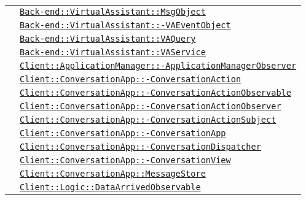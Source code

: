 \begin{longtable}{|>{\centering}m{3cm}|m{10cm}<{\centering}|}
& \hyperref[Back-end::VirtualAssistant::MsgObject]{\texttt{Back-end::VirtualAssistant::MsgObject}}\\
& \hyperref[Back-end::VirtualAssistant::VAEventObject]{\texttt{Back-end::VirtualAssistant::-\linebreak VAEventObject}}\\
& \hyperref[Back-end::VirtualAssistant::VAQuery]{\texttt{Back-end::VirtualAssistant::VAQuery}}\\
& \hyperref[Back-end::VirtualAssistant::VAService]{\texttt{Back-end::VirtualAssistant::VAService}}\\
& \hyperref[Client::ApplicationManager::ApplicationManagerObserver]{\texttt{Client::ApplicationManager::-\linebreak ApplicationManagerObserver}}\\
& \hyperref[Client::ConversationApp::ConversationAction]{\texttt{Client::ConversationApp::-\linebreak ConversationAction}}\\
& \hyperref[Client::ConversationApp::ConversationActionObservable]{\texttt{Client::ConversationApp::-\linebreak ConversationActionObservable}}\\
& \hyperref[Client::ConversationApp::ConversationActionObserver]{\texttt{Client::ConversationApp::-\linebreak ConversationActionObserver}}\\
& \hyperref[Client::ConversationApp::ConversationActionSubject]{\texttt{Client::ConversationApp::-\linebreak ConversationActionSubject}}\\
& \hyperref[Client::ConversationApp::ConversationApp]{\texttt{Client::ConversationApp::-\linebreak ConversationApp}}\\
& \hyperref[Client::ConversationApp::ConversationDispatcher]{\texttt{Client::ConversationApp::-\linebreak ConversationDispatcher}}\\
& \hyperref[Client::ConversationApp::ConversationView]{\texttt{Client::ConversationApp::-\linebreak ConversationView}}\\
& \hyperref[Client::ConversationApp::MessageStore]{\texttt{Client::ConversationApp::MessageStore}}\\
& \hyperref[Client::Logic::DataArrivedObservable]{\texttt{Client::Logic::DataArrivedObservable}}\\

\end{longtable}
